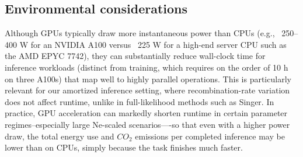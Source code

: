 \documentclass{article}
\begin{document}
{\subsection*{Environmental considerations}
Although GPUs typically draw more instantaneous power than CPUs 
(e.g., ~250–400 W for an NVIDIA A100 versus ~225 W for a high-end server CPU such as the AMD EPYC 7742),
they can substantially reduce wall-clock time for inference workloads 
(distinct from training, which requires on the order of 10 h on three A100s) 
that map well to highly parallel operations. 
This is particularly relevant for our amortized inference setting, 
where recombination-rate variation does not affect runtime, 
unlike in full-likelihood methods such as Singer. 
In practice, GPU acceleration can markedly shorten runtime in certain parameter regimes--especially large Ne-scaled scenarios—-so that even with a higher power draw, 
the total energy use and $CO_{2}$ emissions per completed inference may be lower than on CPUs,
simply because the task finishes much faster.








%
%



}
\end{document}
